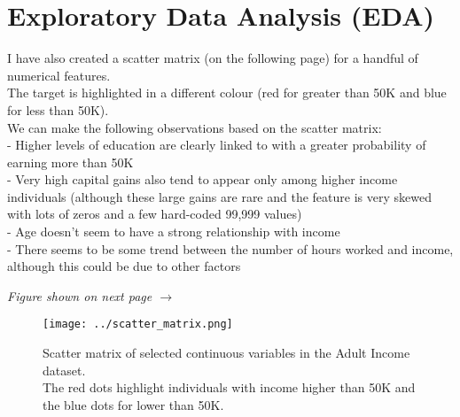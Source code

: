 \documentclass[11pt]{article}
\begin{document}
\section{Exploratory Data Analysis (EDA)}
I have also created a scatter matrix (on the following page) for a handful of numerical features. \\
The target is highlighted in a different colour (red for greater than 50K and blue for less than 50K). \\
We can make the following observations based on the scatter matrix: \\
- Higher levels of education are clearly linked to with a greater probability of earning more than 50K \\
- Very high capital gains also tend to appear only among higher income individuals (although these large gains are rare and the feature is very skewed with lots of zeros and a few hard-coded 99,999 values) \\
- Age doesn't seem to have a strong relationship with income \\
- There seems to be some trend between the number of hours worked and income, although this could be due to other factors \\

\vfill
\begin{center}
    \textit{Figure shown on next page $\rightarrow$}
\end{center}
\newpage

\newpage
\begin{figure}[h!]
  \centering
  \texttt{[image: ../scatter\_matrix.png]}
  \caption{Scatter matrix of selected continuous variables in the Adult Income dataset. \\
            The red dots highlight individuals with income higher than 50K and the blue dots for lower than 50K.}
  \label{fig:scatter}
\end{figure}
\end{document}
